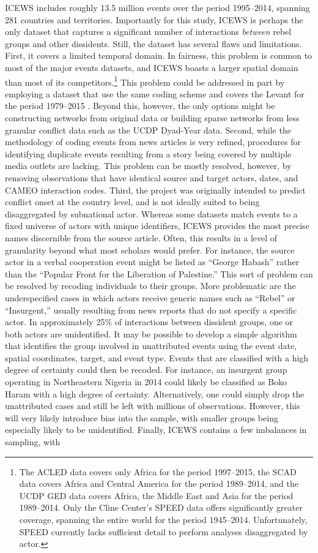 ICEWS includes roughly 13.5 million events over the period 1995--2014, spanning 281 countries and territories. Importantly for this study, ICEWS is perhaps the only dataset that captures a significant number of interactions \textit{between} rebel groups and other dissidents. Still, the dataset has several flaws and limitations. First, it covers a limited temporal domain. In fairness, this problem is common to most of the major events datasets, and ICEWS boasts a larger spatial domain than most of its competitors.\footnote{The ACLED data covers only Africa for the period 1997--2015, the SCAD data covers Africa and Central America for the period 1989--2014, and the UCDP GED data covers Africa, the Middle East and Asia for the period 1989--2014. Only the Cline Center's SPEED data offers significantly greater coverage, spanning the entire world for the period 1945--2014. Unfortunately, SPEED currently lacks sufficient detail to perform analyses disaggregated by actor.} This problem could be addressed in part by employing a dataset that use the same coding scheme and covers the Levant for the period 1979--2015 \citep{Schrodt2015}. Beyond this, however, the only options might be constructing networks from original data or building sparse networks from less granular conflict data such as the UCDP Dyad-Year data. Second, while the methodology of coding events from news articles is very refined, procedures for identifying duplicate events resulting from a story being covered by multiple media outlets are lacking. This problem can be mostly resolved, however, by removing observations that have identical source and target actors, dates, and CAMEO interaction codes. Third, the project was originally intended to predict conflict onset at the country level, and is not ideally suited to being disaggregated by subnational actor. Whereas some datasets match events to a fixed universe of actors with unique identifiers, ICEWS provides the most precise names discernible from the source article. Often, this results in a level of granularity beyond what most scholars would prefer. For instance, the source actor in a verbal cooperation event might be listed as ``George Habash'' rather than the ``Popular Front for the Liberation of Palestine.'' This sort of problem can be resolved by recoding individuals to their groups. More problematic are the underspecified cases in which actors receive generic names such as ``Rebel'' or ``Insurgent,'' usually resulting from news reports that do not specify a specific actor. In approximately 25\% of interactions between dissident groups, one or both actors are unidentified. It may be possible to develop a simple algorithm that identifies the group involved in unattributed events using the event date, spatial coordinates, target, and event type. Events that are classified with a high degree of certainty could then be recoded. For instance, an insurgent group operating in Northeastern Nigeria in 2014 could likely be classified as Boko Haram with a high degree of certainty. Alternatively, one could simply drop the unattributed cases and still be left with millions of observations. However, this will very likely introduce bias into the sample, with smaller groups being especially likely to be unidentified. Finally, ICEWS contains a few imbalances in sampling, with 